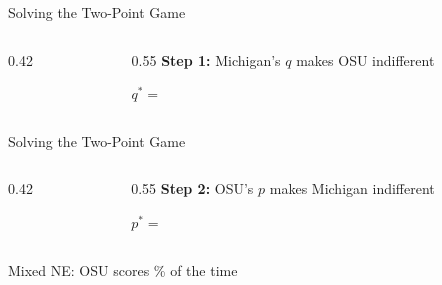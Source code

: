 \begin{frame}{Solving the Two-Point Game}
\begin{columns}[T]
\begin{column}{0.42\textwidth}
\centering
\begin{matrixgame}[top={Stop Run, Stop Pass}, left={Run, Pass}, player names={Ohio State, Michigan}, w=1.9]
\end{matrixgame}
\end{column}
\begin{column}{0.55\textwidth}
\textbf{Step 1:} Michigan's $q$ makes OSU indifferent
\vspace{1.3in}

$q^*=$
\end{column}
\end{columns}
\vfill
\vspace{-0.3in}
\end{frame}

\begin{frame}{Solving the Two-Point Game}
\begin{columns}[T]
\begin{column}{0.42\textwidth}
\centering
\begin{matrixgame}[top={Stop Run, Stop Pass}, left={Run, Pass}, player names={Ohio State, Michigan}, w=1.9]
\end{matrixgame}
\end{column}
\begin{column}{0.55\textwidth}
\textbf{Step 2:} OSU's $p$ makes Michigan indifferent
\vspace{1.3in}

$p^*=$
\end{column}
\end{columns}
\bsk
Mixed NE: \hspace{2.5in} OSU scores \underline{\hspace{0.6in}}\% of the time
\vfill
\vspace{-0.3in}
\end{frame}


